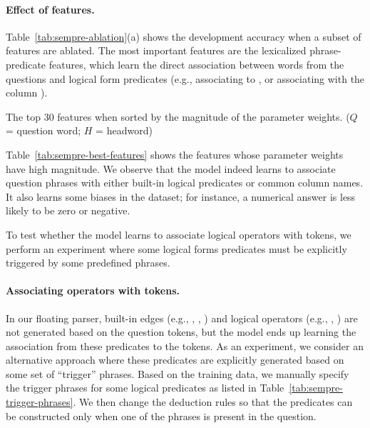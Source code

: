 \paragraph{Effect of features.}
Table~\ref{tab:sempre-ablation}(a)
shows the development accuracy when a subset of features
are ablated.
The most important features are the 
lexicalized phrase-predicate features,
which learn the direct association between
words from the questions and logical form predicates
(e.g., associating  to ,
or associating  with the column ).

\begin{table}[t]\centering

\caption[
Top features from the parser]{
The top 30 features when sorted by the magnitude of the parameter weights.
($Q$ = question word; $H$ = headword)
}
\label{tab:sempre-best-features}
\end{table}

Table~\ref{tab:sempre-best-features}
shows the features whose parameter weights have high magnitude.
We observe that the model indeed learns to associate
question phrases with either built-in logical predicates
or common column names.
It also learns some biases in the dataset;
for instance, a numerical answer is less likely to be zero or negative.

\begin{table}[t] \centering

\caption[Trigger phrases for testing if the model associates operators with tokens.]
{To test whether the model learns to associate
logical operators with tokens,
we perform an experiment where some logical forms
predicates must be explicitly triggered
by some predefined phrases.}
\label{tab:sempre-trigger-phrases}
\end{table}

\paragraph{Associating operators with tokens.}
In our floating parser,
built-in edges (e.g., , , )
and logical operators (e.g., , )
are not generated based on the question tokens,
but the model ends up learning the association
from these predicates to the tokens.
As an experiment,
we consider an alternative approach where
these predicates are explicitly generated based on
some set of ``trigger'' phrases.
Based on the training data,
we manually specify the trigger phrases
for some logical predicates
as listed in Table~\ref{tab:sempre-trigger-phrases}.
We then change the deduction rules so that
the predicates can be constructed
only when one of the phrases is present in the question.


